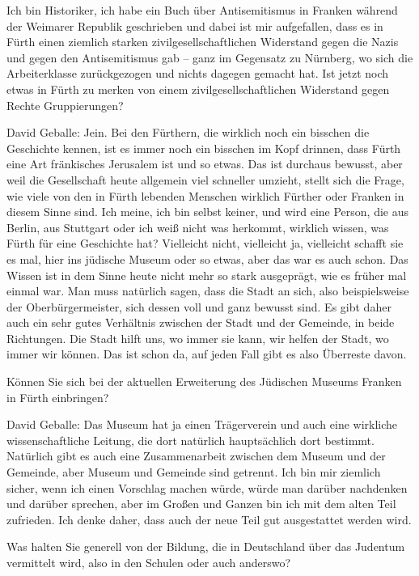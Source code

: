 Ich bin Historiker, ich habe ein Buch über Antisemitismus in Franken während der Weimarer Republik geschrieben und dabei ist mir aufgefallen, dass es in Fürth einen ziemlich starken zivilgesellschaftlichen Widerstand gegen die Nazis und gegen den Antisemitismus gab – ganz im Gegensatz zu Nürnberg, wo sich die Arbeiterklasse zurückgezogen und nichts dagegen gemacht hat. Ist jetzt noch etwas in Fürth zu merken von einem zivilgesellschaftlichen Widerstand gegen Rechte Gruppierungen? 

David Geballe: Jein. Bei den Fürthern, die wirklich noch ein bisschen die Geschichte kennen, ist es immer noch ein bisschen im Kopf drinnen, dass Fürth eine Art fränkisches Jerusalem ist und so etwas. Das ist durchaus bewusst, aber weil die Gesellschaft heute allgemein viel schneller umzieht, stellt sich die Frage, wie viele von den in Fürth lebenden Menschen wirklich Fürther oder Franken in diesem Sinne sind. Ich meine, ich bin selbst keiner, und wird eine Person, die aus Berlin, aus Stuttgart oder ich weiß nicht was herkommt, wirklich wissen, was Fürth für eine Geschichte hat? Vielleicht nicht, vielleicht ja, vielleicht schafft sie es mal, hier ins jüdische Museum oder so etwas, aber das war es auch schon. Das Wissen ist in dem Sinne heute nicht mehr so stark ausgeprägt, wie es früher mal einmal war. Man muss natürlich sagen, dass die Stadt an sich, also beispielsweise der Oberbürgermeister, sich dessen voll und ganz bewusst sind. Es gibt daher auch ein sehr gutes Verhältnis zwischen der Stadt und der Gemeinde, in beide Richtungen. Die Stadt hilft uns, wo immer sie kann, wir helfen der Stadt, wo immer wir können. Das ist schon da, auf jeden Fall gibt es also Überreste davon. 

Können Sie sich bei der aktuellen Erweiterung des Jüdischen Museums Franken in Fürth einbringen? 

David Geballe: Das Museum hat ja einen Trägerverein und auch eine wirkliche wissenschaftliche Leitung, die dort natürlich hauptsächlich dort bestimmt. Natürlich gibt es auch eine Zusammenarbeit zwischen dem Museum und der Gemeinde, aber Museum und Gemeinde sind getrennt. Ich bin mir ziemlich sicher, wenn ich einen Vorschlag machen würde, würde man darüber nachdenken und darüber sprechen, aber im Großen und Ganzen bin ich mit dem alten Teil zufrieden. Ich denke daher, dass auch der neue Teil gut ausgestattet werden wird. 

Was halten Sie generell von der Bildung, die in Deutschland über das Judentum vermittelt wird, also in den Schulen oder auch anderswo? 

